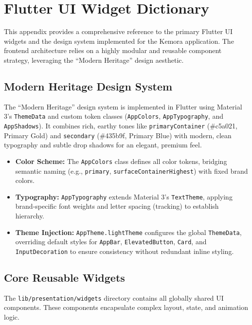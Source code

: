 \chapter{Flutter UI Widget Dictionary}
\label{ch:flutter-ui-widget-dictionary}

This appendix provides a comprehensive reference to the primary Flutter UI widgets and the design system implemented for the Kemora application. The frontend architecture relies on a highly modular and reusable component strategy, leveraging the ``Modern Heritage'' design aesthetic.

\section{Modern Heritage Design System}
\label{sec:modern-heritage-design-system}

The ``Modern Heritage'' design system is implemented in Flutter using Material 3's \texttt{ThemeData} and custom token classes (\texttt{AppColors}, \texttt{AppTypography}, and \texttt{AppShadows}). It combines rich, earthy tones like \texttt{primaryContainer} (\#c5a021, Primary Gold) and \texttt{secondary} (\#435b9f, Primary Blue) with modern, clean typography and subtle drop shadows for an elegant, premium feel.

\begin{itemize}
    \item \textbf{Color Scheme:} The \texttt{AppColors} class defines all color tokens, bridging semantic naming (e.g., \texttt{primary}, \texttt{surfaceContainerHighest}) with fixed brand colors.
    \item \textbf{Typography:} \texttt{AppTypography} extends Material 3's \texttt{TextTheme}, applying brand-specific font weights and letter spacing (tracking) to establish hierarchy.
    \item \textbf{Theme Injection:} \texttt{AppTheme.lightTheme} configures the global \texttt{ThemeData}, overriding default styles for \texttt{AppBar}, \texttt{ElevatedButton}, \texttt{Card}, and \texttt{InputDecoration} to ensure consistency without redundant inline styling.
\end{itemize}

\section{Core Reusable Widgets}
\label{sec:core-reusable-widgets}

The \texttt{lib/presentation/widgets} directory contains all globally shared UI components. These components encapsulate complex layout, state, and animation logic.

